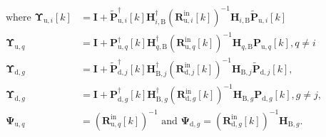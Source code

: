 \documentclass[10pt,journal]{IEEEtran}
\newcommand{\bracket}[1]{{\left [{#1}\right ]}}
\newcommand{\PqB}{\mathbf{P}_{\textrm{u},q}\bracket{k}}
\newcommand{\PqBH}{\mathbf{P}^\dagger_{\textrm{u},q}\bracket{k}}
\newcommand{\PBg}{\mathbf{P}_{\textrm{d},g}\bracket{k}}
\newcommand{\PBgH}{\mathbf{P}^\dagger_{\textrm{d},g}\bracket{k}}
\newcommand{\Rinjin}{\left( \mathbf{R}^{\textrm{in}}_{\mathrm{d},j}\bracket{k}\right)^{-1}}
\newcommand{\Ringin}{\left( \mathbf{R}^{\textrm{in}}_{\mathrm{d},g}\bracket{k}\right)^{-1}}
\newcommand{\Riniin}{\left( \mathbf{R}^\mathrm{in}_{\mathrm{u},i}\bracket{k}\right)^{-1}}
\newcommand{\Rinqin}{\left( \mathbf{R}^{\textrm{in}}_{\mathrm{u},q}\bracket{k}\right)^{-1}}
\newcommand{\HBj}{\mathbf{H}_{\textrm{B},j}}
\newcommand{\HBjH}{\mathbf{H}^\dagger_{\textrm{B},j}}
\newcommand{\HBg}{\mathbf{H}_{\textrm{B},g}}
\newcommand{\HBgH}{\mathbf{H}^\dagger_{\textrm{B},g}}
\newcommand{\HqB}{\mathbf{H}_{q,\textrm{B}}}
\newcommand{\HqBH}{\mathbf{H}^\dagger_{q,\textrm{B}}}
\theoremstyle{definition}
\begin{document}
		\begin{align}
			\textrm{where }\boldsymbol{\Upsilon}_{\textrm{u},i}\bracket{k}&=\mathbf{I}+\widetilde{\mathbf{P}}^\dagger_{\textrm{u},i}\bracket{k}\mathbf{H}^\dagger_{i,\textrm{B}}\Riniin\mathbf{H}_{i,\textrm{B}}\widetilde{\mathbf{P}}_{\textrm{u},i}\bracket{k}\nonumber\\
			\boldsymbol{\Upsilon}_{\textrm{u},q}&=\mathbf{I}+\PqBH\HqBH\Rinqin \HqB\PqB,q\neq i\nonumber\\
			\boldsymbol{\Upsilon}_{\textrm{d},g}&=\mathbf{I}+ \widetilde{\mathbf{P}}^\dagger_{\textrm{d},j}\bracket{k}\HBjH \Rinjin\HBj\widetilde{\mathbf{P}}_{\textrm{d},j}\bracket{k},\nonumber\\
			\boldsymbol{\Upsilon}_{\textrm{d},g}&= \mathbf{I}+\PBgH\HBgH\Ringin\HBg\PBg, g\neq j,\nonumber\\
			\boldsymbol{\Psi}_{\textrm{u},q}&=\Rinqin\textrm{ and }\boldsymbol{\Psi}_{\textrm{d},g}=\Ringin\HBg.\nonumber
		\end{align}\normalsize
		%
		\iffalse
\end{document}
